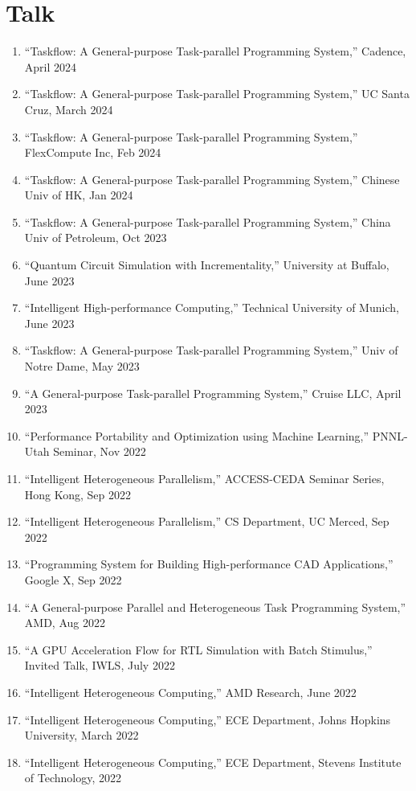 \documentclass[A4,11pt]{article}
\begin{document}
\section{Talk}
 \begin{enumerate}
 \itemsep-0.3em
  \item ``Taskflow: A General-purpose Task-parallel Programming System,'' Cadence, April 2024
  \item ``Taskflow: A General-purpose Task-parallel Programming System,'' UC Santa Cruz, March 2024 
  \item ``Taskflow: A General-purpose Task-parallel Programming System,'' FlexCompute Inc, Feb 2024
  \item ``Taskflow: A General-purpose Task-parallel Programming System,'' Chinese Univ of HK, Jan 2024
  \item ``Taskflow: A General-purpose Task-parallel Programming System,'' China Univ of Petroleum, Oct 2023
  \item ``Quantum Circuit Simulation with Incrementality,'' University at Buffalo, June 2023
  \item ``Intelligent High-performance Computing,'' Technical University of Munich, June 2023
  \item ``Taskflow: A General-purpose Task-parallel Programming System,'' Univ of Notre Dame, May 2023
  \item ``A General-purpose Task-parallel Programming System,'' Cruise LLC, April 2023
  \item ``Performance Portability and Optimization using Machine Learning,'' PNNL-Utah Seminar, Nov 2022
  \item ``Intelligent Heterogeneous Parallelism,'' ACCESS-CEDA Seminar Series, Hong Kong, Sep 2022
  \item ``Intelligent Heterogeneous Parallelism,'' CS Department, UC Merced, Sep 2022
  \item ``Programming System for Building High-performance CAD Applications,'' Google X, Sep 2022
  \item ``A General-purpose Parallel and Heterogeneous Task Programming System,'' AMD, Aug 2022
  \item ``A GPU Acceleration Flow for RTL Simulation with Batch Stimulus,'' Invited Talk, IWLS, July 2022
  \item ``Intelligent Heterogeneous Computing,'' AMD Research, June 2022
  \item ``Intelligent Heterogeneous Computing,'' ECE Department, Johns Hopkins University, March 2022
  \item ``Intelligent Heterogeneous Computing,'' ECE Department, Stevens Institute of Technology, 2022

\end{enumerate}
\end{document}
